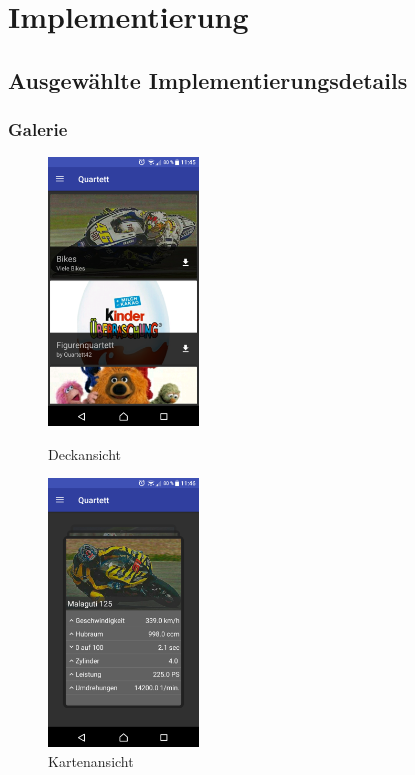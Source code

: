 \documentclass{scrartcl}
\begin{document}
\section{Implementierung}
\subsection{Ausgewählte Implementierungsdetails}
\subsubsection{Galerie}

\begin{figure}[!ht]
  \centering
  \begin{minipage}{0.45\textwidth}
    \centering
    \includegraphics[width=4cm]{img/gallery_decks.png}
    \caption{Deckansicht}
  \end{minipage}
  \hfill
  \begin{minipage}{0.45\textwidth}
    \centering
    \includegraphics[width=4cm]{img/gallery_cards.png}
    \caption{Kartenansicht}
  \end{minipage}
\end{figure}
\end{document}
